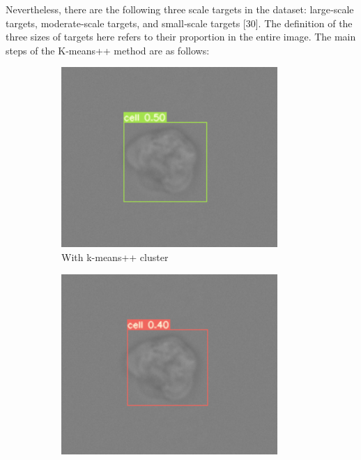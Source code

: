 Nevertheless, there are the following three scale targets in the dataset: large‐scale targets, moderate‐scale targets, and small‐scale targets [30].  The definition of the three sizes of targets here refers to their proportion in the entire image. The main steps of the K‐means++ method are as follows: 
\begin{figure}[h]
	\begin{center}
		\begin{subfigure}[b]{0.49\textwidth}
		    \centering
			\includegraphics[width=0.9\textwidth]{thesis-template-master/images/withkmean.png}
			\caption{With k-means++ cluster}
			\label{fig:cellnet}
		\end{subfigure}
		\begin{subfigure}[b]{0.49\textwidth}
		    \centering
			\includegraphics[width=0.9\textwidth]{thesis-template-master/images/withoutkmean.png}

\end{subfigure}
\end{center}
\end{figure}
